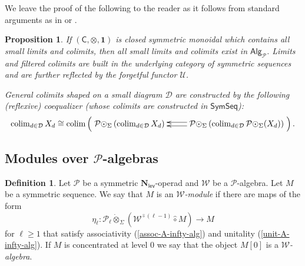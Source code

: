 \documentclass[11pt]{amsart}
\newtheorem{proposition}[subsection]{Proposition}
\theoremstyle{definition}
\newtheorem{definition}[subsection]{Definition}
\theoremstyle{remark}
\newcommand{\Alg}[1]{ {\mathsf{Alg}_{\mathcal{#1}}} }
\newcommand{\SymSeq}{\mathsf{SymSeq}}
\newcommand{\colim}{\operatorname{colim}}
\newcommand{\Cal}[1]{\mathcal{#1}}
\newcommand{\circhat}{\hat{\circ}}
\newcommand{\circdot}{{\odot}}
\newcommand{\tensordot}{\dot{\otimes}}
\newcommand{\Nl}{\mathbf{N}_{\mathsf{lev}}}
\begin{document}
We leave the proof of the following to the reader as it follows from standard arguments as in \cite[3.29]{Har-1} or \cite[4.3]{Bor}.

\begin{proposition} If $(\mathsf{C},\otimes,\mathbf{1})$ is closed symmetric monoidal which contains all small limits and colimits, then all small limits and colimits exist in $\Alg{P}$. Limits and filtered colimits are built in the underlying category of symmetric sequences and are further reflected by the forgetful functor $\Cal{U}$.

General colimits shaped on a small diagram $\Cal{D}$ are constructed by the following (reflexive) coequalizer (whose colimits are constructed in $\SymSeq$): \[ \colim_{d\in\Cal{D}} X_d\cong \colim\left( \xymatrix{
     \Cal{P}\circdot_{\Sigma} \left( \colim_{d\in\Cal{D}} X_d \right) &
     \Cal{P}\circdot_{\Sigma} \left( \colim_{d\in\Cal{D}} \Cal{P}\circdot_{\Sigma}(X_d)\right) \ar@<.5ex>[l] \ar@<-.5ex>[l] 
    } \right).\]
\end{proposition}

\subsection{Modules over $\Cal{P}$-algebras}

\begin{definition} \label{A-infty-alg} 
     Let $\Cal{P}$ be a symmetric $\Nl$-operad and $\Cal{W}$ be a $\Cal{P}$-algebra. Let $M$ be a symmetric sequence. We say that $M$ is an \textit{$\Cal{W}$-module} if there are maps of the form \[\eta_{\ell}\colon \Cal{P}_{\ell} \tensordot_{\Sigma}  \left( \Cal{W}^{\circhat (\ell-1)} \circhat M\right)\to M\] for $\ell\geq 1$ that satisfy associativity (\ref{assoc-A-infty-alg}) and unitality (\ref{unit-A-infty-alg}). If $M$ is concentrated at level $0$ we say that the object $M[0]$ is a \textit{$\Cal{W}$-algebra}. 
\end{definition}
\end{document}
